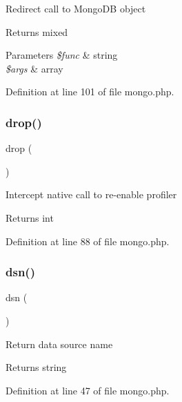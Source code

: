 Redirect call to Mongo\+DB object \begin{DoxyReturn}{Returns}
mixed 
\end{DoxyReturn}

\begin{DoxyParams}{Parameters}
{\em \$func} & string \\
\hline
{\em \$args} & array \\
\hline
\end{DoxyParams}


Definition at line 101 of file mongo.\+php.

\hypertarget{class_d_b_1_1_mongo_aeb639e5b2b713ed87ab8f2033af98ae8}{}\label{class_d_b_1_1_mongo_aeb639e5b2b713ed87ab8f2033af98ae8} 
\subsubsection{\texorpdfstring{drop()}{drop()}}
{\footnotesize\ttfamily drop (\begin{DoxyParamCaption}{ }\end{DoxyParamCaption})}

Intercept native call to re-\/enable profiler \begin{DoxyReturn}{Returns}
int 
\end{DoxyReturn}


Definition at line 88 of file mongo.\+php.

\hypertarget{class_d_b_1_1_mongo_af0196134b8f5405b3fe27fcceece0061}{}\label{class_d_b_1_1_mongo_af0196134b8f5405b3fe27fcceece0061} 
\subsubsection{\texorpdfstring{dsn()}{dsn()}}
{\footnotesize\ttfamily dsn (\begin{DoxyParamCaption}{ }\end{DoxyParamCaption})}

Return data source name \begin{DoxyReturn}{Returns}
string 
\end{DoxyReturn}


Definition at line 47 of file mongo.\+php.

\hypertarget{class_d_b_1_1_mongo_a92faa80a7077936bd630e5dcc7bb4a64}{}\label{class_d_b_1_1_mongo_a92faa80a7077936bd630e5dcc7bb4a64} 
